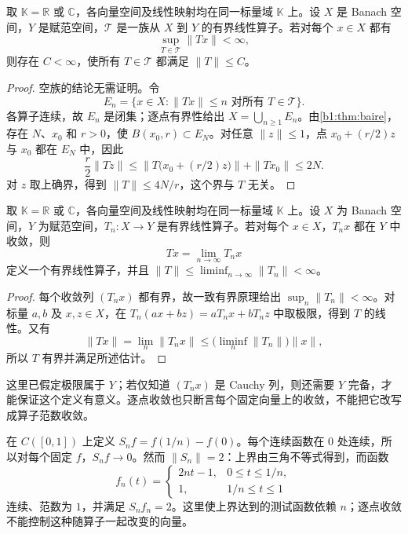\begin{theorem}
\label{b1:thm:uniform-boundedness}
取 \(\mathbb K=\mathbb R\) 或 \(\mathbb C\)，各向量空间及线性映射均在同一标量域 \(\mathbb K\) 上。设 \(X\) 是 Banach 空间，\(Y\) 是赋范空间，\(\mathcal T\) 是一族从 \(X\) 到 \(Y\) 的有界线性算子。若对每个 \(x\in X\) 都有
\[
 \sup_{T\in\mathcal T}\|Tx\|<\infty,
\]
则存在 \(C<\infty\)，使所有 \(T\in\mathcal T\) 都满足 \(\|T\|\le C\)。
\end{theorem}

\begin{proof}
空族的结论无需证明。令
\[
 E_n=\{x\in X:\|Tx\|\le n\text{ 对所有 }T\in\mathcal T\}.
\]
各算子连续，故 \(E_n\) 是闭集；逐点有界性给出 \(X=\bigcup_{n\ge1}E_n\)。由\cref{b1:thm:baire}，存在 \(N\)、\(x_0\) 和 \(r>0\)，使 \(B(x_0,r)\subset E_N\)。对任意 \(\|z\|\le1\)，点 \(x_0+(r/2)z\) 与 \(x_0\) 都在 \(E_N\) 中，因此
\[
 \frac r2\|Tz\|
 \le \|T\bigl(x_0+(r/2)z\bigr)\|+\|Tx_0\|\le 2N.
\]
对 \(z\) 取上确界，得到 \(\|T\|\le4N/r\)，这个界与 \(T\) 无关。
\end{proof}

\begin{corollary}[有界线性算子的逐点极限]
\label{b1:cor:pointwise-operator-limit}
取 \(\mathbb K=\mathbb R\) 或 \(\mathbb C\)，各向量空间及线性映射均在同一标量域 \(\mathbb K\) 上。设 \(X\) 为 Banach 空间，\(Y\) 为赋范空间，\(T_n:X\to Y\) 是有界线性算子。若对每个 \(x\in X\)，\(T_nx\) 都在 \(Y\) 中收敛，则
\[
 Tx=\lim_{n\to\infty}T_nx
\]
定义一个有界线性算子，并且 \(\|T\|\le\liminf_{n\to\infty}\|T_n\|<\infty\)。
\end{corollary}

\begin{proof}
每个收敛列 \((T_nx)\) 都有界，故一致有界原理给出 \(\sup_n\|T_n\|<\infty\)。对标量 \(a,b\) 及 \(x,z\in X\)，在 \(T_n(ax+bz)=aT_nx+bT_nz\) 中取极限，得到 \(T\) 的线性。又有
\[
 \|Tx\|=\lim_n\|T_nx\|
 \le\bigl(\liminf_n\|T_n\|\bigr)\|x\|,
\]
所以 \(T\) 有界并满足所述估计。
\end{proof}

这里已假定极限属于 \(Y\)；若仅知道 \((T_nx)\) 是 Cauchy 列，则还需要 \(Y\) 完备，才能保证这个定义有意义。逐点收敛也只断言每个固定向量上的收敛，不能把它改写成算子范数收敛。

\ProseParagraphBreak

在 \(C([0,1])\) 上定义 \(S_nf=f(1/n)-f(0)\)。每个连续函数在 \(0\) 处连续，所以对每个固定 \(f\)，\(S_nf\to0\)。然而 \(\|S_n\|=2\)：上界由三角不等式得到，而函数
\[
 f_n(t)=
 \begin{cases}
  2nt-1,&0\le t\le1/n,\\
  1,&1/n\le t\le1
 \end{cases}
\]
连续、范数为 \(1\)，并满足 \(S_nf_n=2\)。这里使上界达到的测试函数依赖 \(n\)；逐点收敛不能控制这种随算子一起改变的向量。


